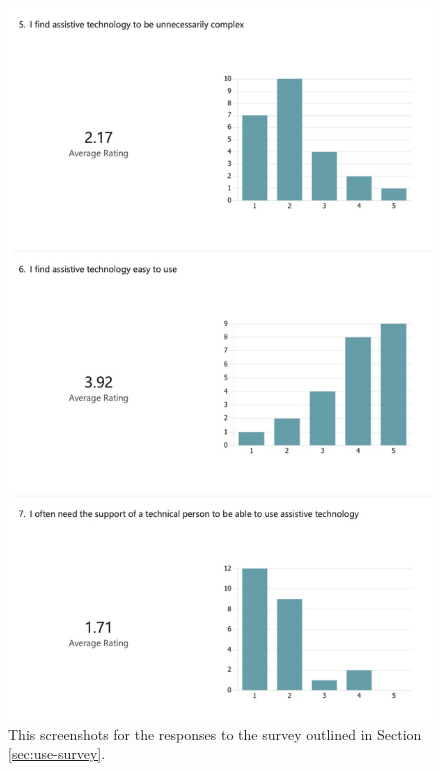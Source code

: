 \documentclass{l4proj}
\begin{document}
\begin{appendices}
\begin{figure}[H]
    \centering
    \includegraphics[width=0.75\linewidth]{dissertation/images/use-survey-2.jpeg}    
    \caption{This screenshots for the responses to the survey outlined in Section \ref{sec:use-survey}.}
    \label{fig:use-survey-2} 
\end{figure}


\end{appendices}
\end{document}
